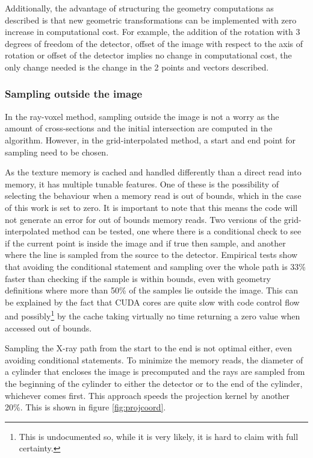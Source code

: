 Additionally, the advantage of structuring the geometry computations as described is that new geometric transformations can be implemented with zero increase in computational cost. For example, the addition of the rotation with 3 degrees of freedom of the detector, offset of the image with respect to the axis of rotation or offset of the detector implies no change in computational cost, the only change needed is the change in the 2 points and vectors described.
 
\subsubsection{Sampling outside the image}

In the ray-voxel method, sampling outside the image is not a worry as the amount of cross-sections and the initial intersection are computed in the algorithm. However, in the grid-interpolated method, a start and end point for sampling need to be chosen. 

As the texture memory is cached and handled differently than a direct read into memory, it has multiple tunable features. One of these is the possibility of selecting the behaviour when a memory read is out of bounds, which in the case of this work is set to zero. It is important to note that this means the code will not generate an error for out of bounds memory reads. Two versions of the grid-interpolated method can be tested, one where there is a conditional check to see if the current point is inside the image and if true then sample, and another where the line is sampled from the source to the detector. Empirical tests show that avoiding the conditional statement and sampling over the whole path is 33\% faster than checking if the sample is within bounds, even with geometry definitions where more than 50\% of the samples lie outside the image. This can be explained by the fact that CUDA cores are quite slow with code control flow and possibly\footnote{This is undocumented so, while it is very likely, it is hard to claim with full certainty.} by the cache taking virtually no time returning a zero value when accessed out of bounds. 

Sampling the X-ray path from the start to the end is not optimal either, even avoiding conditional statements. To minimize the memory reads, the diameter of a cylinder that encloses the image is precomputed and the rays are sampled from the beginning of the cylinder to either the detector or to the end of the cylinder, whichever comes first. This approach speeds the projection kernel by another 20\%. This is shown in figure \ref{fig:projcoord}.

